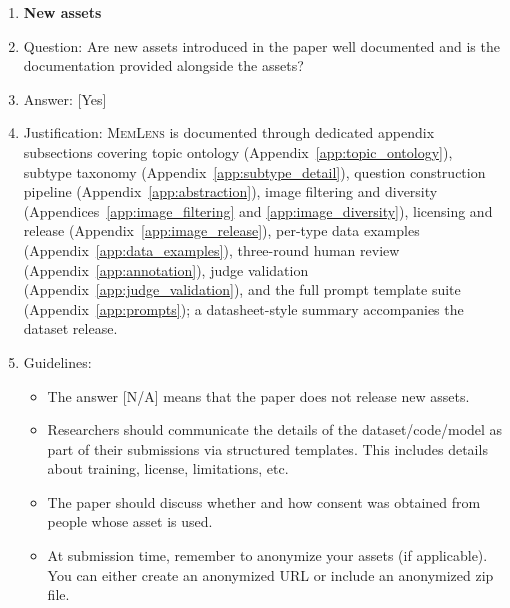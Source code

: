 \documentclass{llmxive}
\providecommand{\bench}{\textsc{MemLens}}
\providecommand{\answerYes}[1][]{[Yes]#1}
\providecommand{\answerNA}[1][]{[N/A]#1}
\begin{document}
\begin{enumerate}
\item {\bf New assets}
    \item[] Question: Are new assets introduced in the paper well documented and is the documentation provided alongside the assets?
    \item[] Answer: \answerYes{}
    \item[] Justification: \bench{} is documented through dedicated appendix subsections covering topic ontology (Appendix~\ref{app:topic_ontology}), subtype taxonomy (Appendix~\ref{app:subtype_detail}), question construction pipeline (Appendix~\ref{app:abstraction}), image filtering and diversity (Appendices~\ref{app:image_filtering} and \ref{app:image_diversity}), licensing and release (Appendix~\ref{app:image_release}), per-type data examples (Appendix~\ref{app:data_examples}), three-round human review (Appendix~\ref{app:annotation}), judge validation (Appendix~\ref{app:judge_validation}), and the full prompt template suite (Appendix~\ref{app:prompts}); a datasheet-style summary accompanies the dataset release.
    \item[] Guidelines:
    \begin{itemize}
        \item The answer \answerNA{} means that the paper does not release new assets.
        \item Researchers should communicate the details of the dataset\slash code\slash model as part of their submissions via structured templates. This includes details about training, license, limitations, etc.
        \item The paper should discuss whether and how consent was obtained from people whose asset is used.
        \item At submission time, remember to anonymize your assets (if applicable). You can either create an anonymized URL or include an anonymized zip file.
    \end{itemize}


\end{enumerate}
\end{document}
